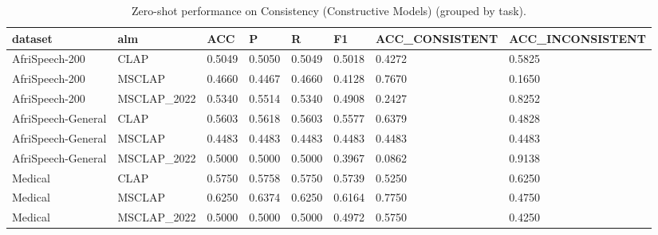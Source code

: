 \begin{table}
\caption{Zero-shot performance on Consistency (Constructive Models) (grouped by task).}
\label{tab:consistency_constructive_models_results}
\begin{tabular}{llllllll}
\toprule
dataset & alm & ACC & P & R & F1 & ACC\_CONSISTENT & ACC\_INCONSISTENT \\
\midrule
AfriSpeech-200 & CLAP & 0.5049 & 0.5050 & 0.5049 & 0.5018 & 0.4272 & 0.5825 \\
AfriSpeech-200 & MSCLAP & 0.4660 & 0.4467 & 0.4660 & 0.4128 & 0.7670 & 0.1650 \\
AfriSpeech-200 & MSCLAP\_2022 & 0.5340 & 0.5514 & 0.5340 & 0.4908 & 0.2427 & 0.8252 \\
AfriSpeech-General & CLAP & 0.5603 & 0.5618 & 0.5603 & 0.5577 & 0.6379 & 0.4828 \\
AfriSpeech-General & MSCLAP & 0.4483 & 0.4483 & 0.4483 & 0.4483 & 0.4483 & 0.4483 \\
AfriSpeech-General & MSCLAP\_2022 & 0.5000 & 0.5000 & 0.5000 & 0.3967 & 0.0862 & 0.9138 \\
Medical & CLAP & 0.5750 & 0.5758 & 0.5750 & 0.5739 & 0.5250 & 0.6250 \\
Medical & MSCLAP & 0.6250 & 0.6374 & 0.6250 & 0.6164 & 0.7750 & 0.4750 \\
Medical & MSCLAP\_2022 & 0.5000 & 0.5000 & 0.5000 & 0.4972 & 0.5750 & 0.4250 \\
\bottomrule
\end{tabular}
\end{table}
